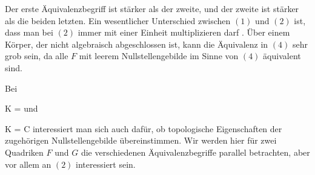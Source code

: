 Der erste Äquivalenzbegriff ist stärker als der zweite, und der zweite ist stärker als die beiden letzten. Ein wesentlicher Unterschied zwischen $(1)$ und $(2)$ ist, dass man bei $(2)$ immer mit einer Einheit multiplizieren darf
 {} {.}
Über einem Körper, der nicht algebraisch abgeschlossen ist, kann die Äquivalenz in $(4)$ sehr grob sein, da alle $F$ mit leerem Nullstellengebilde im Sinne von $(4)$ äquivalent sind.

Bei

\mavergleichskette
{\vergleichskette
{ K
}
{ = }{ \R
}
{  }{
}
{    }{
}
{   }{
}
}
{}{}{}
und

\mavergleichskette
{\vergleichskette
{ K
}
{ = }{ {\mathbb C}
}
{  }{
}
{    }{
}
{   }{
}
}
{}{}{}
interessiert man sich auch dafür, ob topologische Eigenschaften der zugehörigen Nullstellengebilde übereinstimmen. Wir werden hier für zwei Quadriken $F$ und $G$ die verschiedenen Äquivalenzbegriffe parallel betrachten, aber vor allem an $(2)$ interessiert sein.





